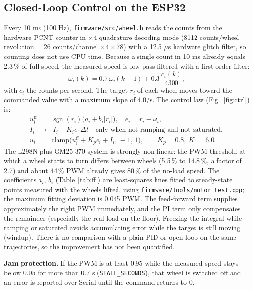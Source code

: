 \documentclass[11pt,a4paper]{article}
\newcommand{\code}[1]{\texttt{\small #1}}
\begin{document}
\subsection{Closed-Loop Control on the ESP32}\label{sec:control}
Every 10 ms (100 Hz), \code{firmware/src/wheel.h} reads the counts from the hardware PCNT counter in $\times4$ quadrature decoding mode (8112 counts/wheel revolution = 26 counts/channel $\times4\times78$) with a 12.5 $\mu$s hardware glitch filter, so counting does not use CPU time. Because a single count in 10 ms already equals 2.3\,\% of full speed, the measured speed is low-pass filtered with a first-order filter:
\begin{equation}
\omega_i(k)=0.7\,\omega_i(k-1)+0.3\,\frac{c_i(k)}{4300},
\end{equation}
with $c_i$ the counts per second. The target $r_i$ of each wheel moves toward the commanded value with a maximum slope of 4.0/s. The control law (Fig.~\ref{fig:ctrl}) is:
\begin{align}
u^{\mathrm{ff}}_i&=\operatorname{sgn}(r_i)\bigl(a_i+b_i|r_i|\bigr), \quad e_i=r_i-\omega_i,\\
I_i&\leftarrow I_i+K_i e_i\,\Delta t\quad\text{only when not ramping and not saturated},\\
u_i&=\mathrm{clamp}\bigl(u^{\mathrm{ff}}_i+K_p e_i+I_i,\,-1,\,1\bigr),\qquad K_p=0.8,\ K_i=6.0.
\end{align}
The L298N plus GM25-370 system is strongly non-linear: the PWM threshold at which a wheel starts to turn differs between wheels (5.5\,\% to 14.8\,\%, a factor of 2.7) and about 44\,\% PWM already gives 80\,\% of the no-load speed. The coefficients $a_i$, $b_i$ (Table~\ref{tab:ff}) are least-squares lines fitted to steady-state points measured with the wheels lifted, using \code{firmware/tools/motor\_test.cpp}; the maximum fitting deviation is 0.045 PWM. The feed-forward term supplies approximately the right PWM immediately, and the PI term only compensates the remainder (especially the real load on the floor). Freezing the integral while ramping or saturated avoids accumulating error while the target is still moving (windup). There is no comparison with a plain PID or open loop on the same trajectories, so the improvement has not been quantified.

\textbf{Jam protection.} If the PWM is at least 0.95 while the measured speed stays below 0.05 for more than 0.7 s (\code{STALL\_SECONDS}), that wheel is switched off and an error is reported over Serial until the command returns to 0.
\end{document}
